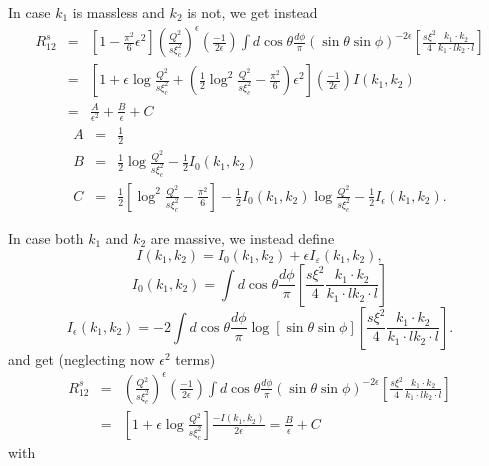 \documentclass{letter}
\begin{document}
In case $k_1$ is massless and $k_2$ is not, we get instead
\begin{eqnarray}
  R^s_{12} & = & \left[ 1 - \frac{\pi^2}{6} \epsilon^2 \right] \left(
  \frac{Q^2}{s \xi_c^2} \right)^{\epsilon} \left( \frac{- 1}{2 \epsilon}
  \right) \int d \cos \theta \frac{d \phi}{\pi} (\sin \theta \sin \phi)^{- 2
  \epsilon}  \left[ \frac{s \xi^2}{4} \frac{k_1 \cdot k_2}{k_1 \cdot l k_2
  \cdot l} \right] \nonumber\\
  & = & \left[ 1 + \epsilon \log \frac{Q^2}{s \xi_c^2} + \left( \frac{1}{2}
  \log^2 \frac{Q^2}{s \xi_c^2} - \frac{\pi^2}{6} \right) \epsilon^2 \right]
  \left( \frac{- 1}{2 \epsilon} \right) I (k_1, k_2) \nonumber\\
  & = & \frac{A}{\epsilon^2} + \frac{B}{\epsilon} + C 
\end{eqnarray}
\begin{eqnarray}
  A & = & \frac{1}{2} \\
  B & = & \frac{1}{2} \log \frac{Q^2}{s \xi_c^2} - \frac{1}{2} I_0 (k_1, k_2)
  \\
  C & = & \frac{1}{2} \left[ \log^2 \frac{Q^2}{s \xi_c^2} - \frac{\pi^2}{6}
  \right] - \frac{1}{2} I_0 (k_1, k_2) \log \frac{Q^2}{s \xi_c^2} -
  \frac{1}{2} I_{\epsilon} (k_1, k_2) . 
\end{eqnarray}

In case both $k_1$ and $k_2$ are massive, we instead define
\begin{equation}
  I (k_1, k_2) = I_0 (k_1, k_2) + \epsilon I_{\varepsilon} (k_1, k_2),
\end{equation}
\begin{equation}
  I_0 (k_1, k_2) = \int d \cos \theta \frac{d \phi}{\pi}  \left[ \frac{s
  \xi^2}{4} \frac{k_1 \cdot k_2}{k_1 \cdot l k_2 \cdot l} \right] 
\end{equation}
\begin{equation}
  I_{\epsilon} (k_1, k_2) = - 2 \int d \cos \theta \frac{d \phi}{\pi} \log
  [\sin \theta \sin \phi] \left[ \frac{s \xi^2}{4} \frac{k_1 \cdot k_2}{k_1
  \cdot l k_2 \cdot l} \right] .
\end{equation}
and get (neglecting now $\epsilon^2$ terms)
\begin{eqnarray}
  R^s_{12} & = & \left( \frac{Q^2}{s \xi_c^2} \right)^{\epsilon} \left(
  \frac{- 1}{2 \epsilon} \right) \int d \cos \theta \frac{d \phi}{\pi} (\sin
  \theta \sin \phi)^{- 2 \epsilon}  \left[ \frac{s \xi^2}{4} \frac{k_1 \cdot
  k_2}{k_1 \cdot l k_2 \cdot l} \right] \nonumber\\
  & = & \left[ 1 + \epsilon \log \frac{Q^2}{s \xi_c^2} \right] \frac{- I
  (k_1, k_2)}{2 \epsilon} = \frac{B}{\epsilon} + C 
\end{eqnarray}
with
\end{document}
